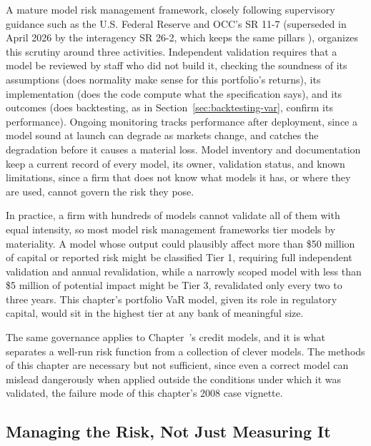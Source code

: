 \documentclass[../ai_in_finance]{subfiles}
\begin{document}
A mature model risk management framework, closely following supervisory guidance such as the U.S. Federal Reserve and OCC's SR 11-7 (superseded in April 2026 by the interagency SR 26-2, which keeps the same pillars \parencite{frb2026revised}), organizes this scrutiny around three activities. Independent validation requires that a model be reviewed by staff who did not build it, checking the soundness of its assumptions (does normality make sense for this portfolio's returns), its implementation (does the code compute what the specification says), and its outcomes (does backtesting, as in Section~\ref{sec:backtesting-var}, confirm its performance).
Ongoing monitoring tracks performance after deployment, since a model sound at launch can degrade as markets change, and catches the degradation before it causes a material loss.
Model inventory and documentation keep a current record of every model, its owner, validation status, and known limitations, since a firm that does not know what models it has, or where they are used, cannot govern the risk they pose.

In practice, a firm with hundreds of models cannot validate all of them with equal intensity, so most model risk management frameworks tier models by materiality. A model whose output could plausibly affect more than \$50 million of capital or reported risk might be classified Tier 1, requiring full independent validation and annual revalidation, while a narrowly scoped model with less than \$5 million of potential impact might be Tier 3, revalidated only every two to three years. This chapter's portfolio VaR model, given its role in regulatory capital, would sit in the highest tier at any bank of meaningful size.

The same governance applies to Chapter~'s credit models, and it is what separates a well-run risk function from a collection of clever models. The methods of this chapter are necessary but not sufficient, since even a correct model can mislead dangerously when applied outside the conditions under which it was validated, the failure mode of this chapter's 2008 case vignette.

\subsection{Managing the Risk, Not Just Measuring It}
\label{sec:managing-risk}
\end{document}
